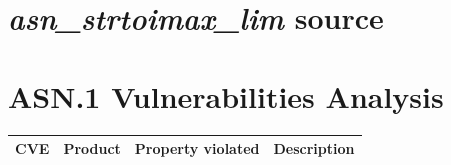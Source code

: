 \documentclass[acmsmall,nonacm]{acmart}
\begin{document}
\appendix
\clearpage
\section{\emph{asn\_strtoimax\_lim} source}
\label{sec:stritomax}



\newpage

\section{ASN.1 Vulnerabilities Analysis}
\label{sec:cve}
\bigskip

\scriptsize

\begin{longtable}{ l l l p{15em} }
 
  {\bf CVE } &  {\bf Product  } &  {\bf Property violated  }  &  {\bf Description  } \\

  \hline


\end{longtable}
\end{document}
